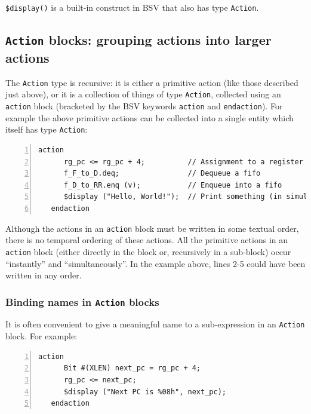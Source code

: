 
\verb|$display()| is a built-in construct in BSV that also has type
\verb|Action|.


\subsection{{\tt Action} blocks: grouping actions into larger actions}


The \verb|Action| type is recursive: it is either a primitive action
(like those described just above), or it is a collection of things of
type \verb|Action|, collected using an \verb|action| block (bracketed
by the BSV keywords \verb|action| and \verb|endaction|).  For example
the above primitive actions can be collected into a single entity
which itself has type \verb|Action|:

{\small
\begin{Verbatim}[frame=single, numbers=left]
   action
      rg_pc <= rg_pc + 4;          // Assignment to a register
      f_F_to_D.deq;                // Dequeue a fifo
      f_D_to_RR.enq (v);           // Enqueue into a fifo
      $display ("Hello, World!");  // Print something (in simulation only)
   endaction
\end{Verbatim}
}

Although the actions in an \verb|action| block must be written in some
textual order, there is no temporal ordering of these actions.  All
the primitive actions in an \verb|action| block (either directly in
the block or, recursively in a sub-block) occur ``instantly'' and
``simultaneously''.  In the example above, lines 2-5 could have been
written in any order.


\subsubsection{Binding names in {\tt Action} blocks}


It is often convenient to give a meaningful name to a sub-expression
in an {\tt Action} block.  For example:

{\small
\begin{Verbatim}[frame=single, numbers=left]
   action
      Bit #(XLEN) next_pc = rg_pc + 4;
      rg_pc <= next_pc;
      $display ("Next PC is %08h", next_pc);
   endaction
\end{Verbatim}
}

